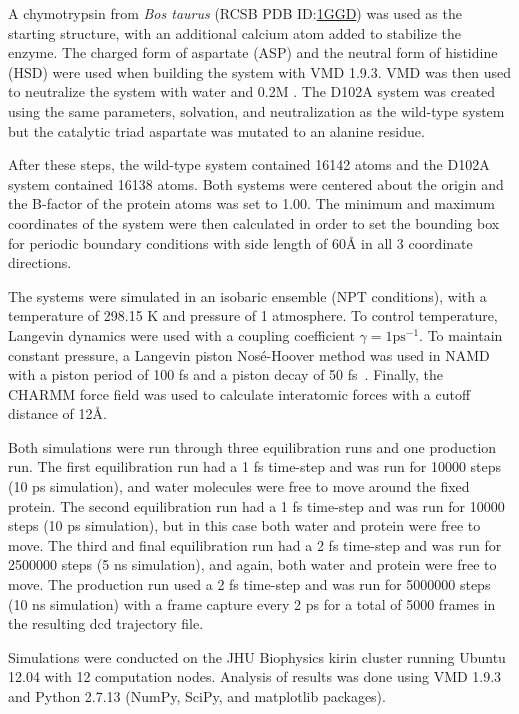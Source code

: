 \documentclass[11pt, twocolumn]{article}
\begin{document}
A chymotrypsin from \textit{Bos taurus}
(RCSB PDB ID:\@ \href{http://www.rcsb.org/pdb/explore.do?structureId=1ggd}{1GGD})
was used as the starting structure, with an additional calcium atom added to
stabilize the enzyme. The charged form of aspartate (ASP) and the neutral form
of histidine (HSD) were used when building the system with VMD 1.9.3.
VMD was then used to neutralize the system with water and 0.2M .
The D102A system was created using the same parameters, solvation, and
neutralization as the wild-type system but the catalytic triad aspartate was
mutated to an alanine residue.

After these steps, the wild-type system contained 16142 atoms and the D102A
system contained 16138 atoms. Both systems were centered about the origin and
the B-factor of the protein atoms was set to 1.00. The minimum and maximum
coordinates of the system were then calculated in order to set the bounding
box for periodic boundary conditions with side length of 60\AA{} in all 3
coordinate directions.

The systems were simulated in an isobaric ensemble (NPT conditions), with a
temperature of 298.15 K and pressure of 1 atmosphere. To control temperature,
Langevin dynamics were used with a coupling coefficient
\(\gamma = 1 \mathrm{ps}^{-1}\). To maintain constant pressure, a Langevin
piston Nos\'e-Hoover method was used in NAMD with a piston period of
100 fs and a piston decay of 50 fs~\cite{namd05}. Finally, the CHARMM
force field was used to calculate interatomic forces with a cutoff distance
of 12\AA{}.

Both simulations were run through three equilibration runs and one production
run. The first equilibration run had a 1 fs time-step and was run for 10000
steps (10 ps simulation), and water molecules were free to move around the
fixed protein.
The second equilibration run had a 1 fs time-step and was run for 10000 steps
(10 ps simulation), but in this case both water and protein were free to move.
The third and final equilibration run had a 2 fs time-step and was run for
2500000 steps (5 ns simulation), and again, both water and protein were free
to move.
The production run used a 2 fs time-step and was run for 5000000 steps (10 ns
simulation) with a frame capture every 2 ps for a total of 5000 frames in the
resulting dcd trajectory file.

Simulations were conducted on the JHU Biophysics kirin cluster running Ubuntu
12.04 with 12 computation nodes. Analysis of results was done using VMD 1.9.3
and Python 2.7.13 (NumPy, SciPy, and matplotlib packages).
\end{document}
